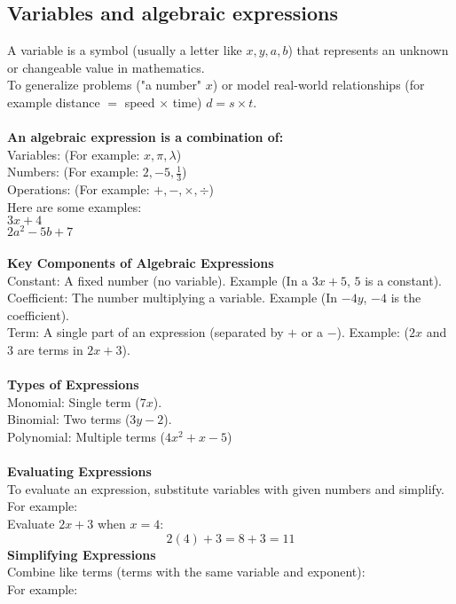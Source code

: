 \documentclass{article} %
\begin{document}
\subsection{Variables and algebraic expressions}
A variable is a symbol (usually a letter like $x, y, a, b$) that represents an unknown or changeable value in mathematics.\\
To generalize problems ("a number" $x$) or model real-world relationships (for example distance $=$ speed $\times$ time) $d =s \times t$.\\
\\
\textbf{An algebraic expression is a combination of:}\\
Variables: (For example: $x, \pi, \lambda$)\\
Numbers: (For example: $2, -5, \frac{1}{3}$)\\
Operations: (For example: $+ , - , \times , \div $)\\
Here are some examples:\\
$3x + 4$\\
$2a^{2}-5b+7$\\
\\
\textbf{Key Components of Algebraic Expressions}\\
Constant: A fixed number (no variable). Example (In a $3x + 5$, $5$ is a constant).\\
Coefficient: The number multiplying a variable. Example (In $-4y$, $-4$ is the coefficient).\\
Term: A single part of an expression (separated by $+$ or a $-$). Example: ($2x$ and $3$ are terms in $2x+3$).\\
\\
\textbf{Types of Expressions}\\
Monomial: Single term ($7x$).\\
Binomial: Two terms ($3y - 2$).\\
Polynomial: Multiple terms ($4x^{2}+x-5$)\\
\\
\textbf{Evaluating Expressions}\\
To evaluate an expression, substitute variables with given numbers and simplify.\\
For example:\\
Evaluate $2x+3$ when $x = 4$:
\[
2(4)+3 = 8 + 3 = 11
\]
\textbf{Simplifying Expressions}\\
Combine like terms (terms with the same variable and exponent):\\
For example:\\
\end{document}
